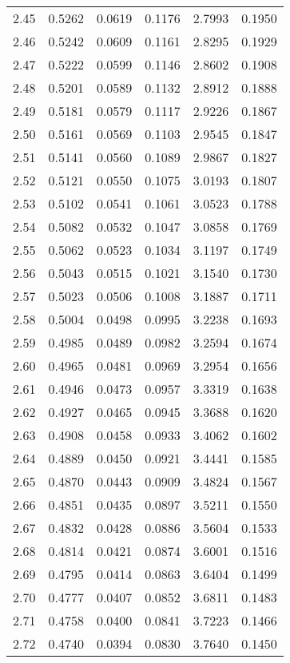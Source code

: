 \documentclass{article}
\begin{document}
\begin{longtable}{cccccc}
2.45 & 0.5262 & 0.0619 & 0.1176 & 2.7993 & 0.1950 \\
2.46 & 0.5242 & 0.0609 & 0.1161 & 2.8295 & 0.1929 \\
2.47 & 0.5222 & 0.0599 & 0.1146 & 2.8602 & 0.1908 \\
2.48 & 0.5201 & 0.0589 & 0.1132 & 2.8912 & 0.1888 \\
2.49 & 0.5181 & 0.0579 & 0.1117 & 2.9226 & 0.1867 \\
2.50 & 0.5161 & 0.0569 & 0.1103 & 2.9545 & 0.1847 \\
2.51 & 0.5141 & 0.0560 & 0.1089 & 2.9867 & 0.1827 \\
2.52 & 0.5121 & 0.0550 & 0.1075 & 3.0193 & 0.1807 \\
2.53 & 0.5102 & 0.0541 & 0.1061 & 3.0523 & 0.1788 \\
2.54 & 0.5082 & 0.0532 & 0.1047 & 3.0858 & 0.1769 \\
2.55 & 0.5062 & 0.0523 & 0.1034 & 3.1197 & 0.1749 \\
2.56 & 0.5043 & 0.0515 & 0.1021 & 3.1540 & 0.1730 \\
2.57 & 0.5023 & 0.0506 & 0.1008 & 3.1887 & 0.1711 \\
2.58 & 0.5004 & 0.0498 & 0.0995 & 3.2238 & 0.1693 \\
2.59 & 0.4985 & 0.0489 & 0.0982 & 3.2594 & 0.1674 \\
2.60 & 0.4965 & 0.0481 & 0.0969 & 3.2954 & 0.1656 \\
2.61 & 0.4946 & 0.0473 & 0.0957 & 3.3319 & 0.1638 \\
2.62 & 0.4927 & 0.0465 & 0.0945 & 3.3688 & 0.1620 \\
2.63 & 0.4908 & 0.0458 & 0.0933 & 3.4062 & 0.1602 \\
2.64 & 0.4889 & 0.0450 & 0.0921 & 3.4441 & 0.1585 \\
2.65 & 0.4870 & 0.0443 & 0.0909 & 3.4824 & 0.1567 \\
2.66 & 0.4851 & 0.0435 & 0.0897 & 3.5211 & 0.1550 \\
2.67 & 0.4832 & 0.0428 & 0.0886 & 3.5604 & 0.1533 \\
2.68 & 0.4814 & 0.0421 & 0.0874 & 3.6001 & 0.1516 \\
2.69 & 0.4795 & 0.0414 & 0.0863 & 3.6404 & 0.1499 \\
2.70 & 0.4777 & 0.0407 & 0.0852 & 3.6811 & 0.1483 \\
2.71 & 0.4758 & 0.0400 & 0.0841 & 3.7223 & 0.1466 \\
2.72 & 0.4740 & 0.0394 & 0.0830 & 3.7640 & 0.1450 \\

\end{longtable}
\end{document}

